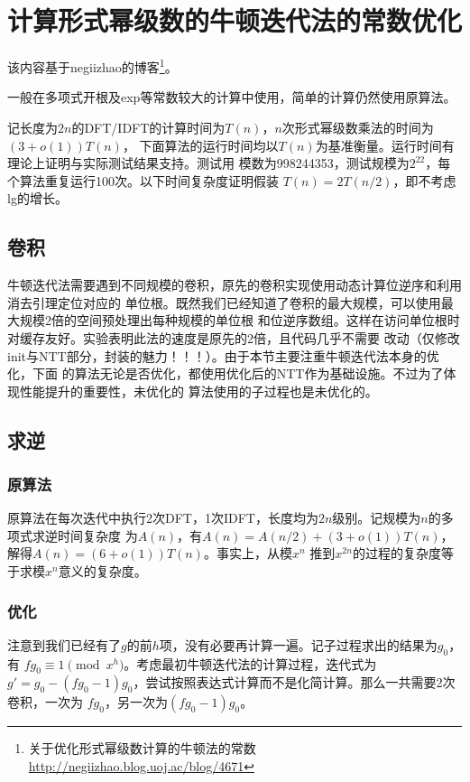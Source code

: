 \section{计算形式幂级数的牛顿迭代法的常数优化}\label{Optmize}
该内容基于negiizhao的博客\footnote{
    关于优化形式幂级数计算的牛顿法的常数\\
    \url{http://negiizhao.blog.uoj.ac/blog/4671}
}。

一般在多项式开根及exp等常数较大的计算中使用，简单的计算仍然使用原算法。

记长度为$2n$的DFT/IDFT的计算时间为$T(n)$，$n$次形式幂级数乘法的时间为$(3+o(1))T(n)$，
下面算法的运行时间均以$T(n)$为基准衡量。运行时间有理论上证明与实际测试结果支持。测试用
模数为998244353，测试规模为$2^{22}$，每个算法重复运行100次。以下时间复杂度证明假装
$T(n)=2T(n/2)$，即不考虑lg的增长。

\subsection{卷积}
牛顿迭代法需要遇到不同规模的卷积，原先的卷积实现使用动态计算位逆序和利用消去引理定位对应的
单位根。既然我们已经知道了卷积的最大规模，可以使用最大规模2倍的空间预处理出每种规模的单位根
和位逆序数组。这样在访问单位根时对缓存友好。实验表明此法的速度是原先的2倍，且代码几乎不需要
改动（仅修改init与NTT部分，封装的魅力！！！）。由于本节主要注重牛顿迭代法本身的优化，下面
的算法无论是否优化，都使用优化后的NTT作为基础设施。不过为了体现性能提升的重要性，未优化的
算法使用的子过程也是未优化的。

\subsection{求逆}
\subsubsection{原算法}
原算法在每次迭代中执行2次DFT，1次IDFT，长度均为$2n$级别。记规模为$n$的多项式求逆时间复杂度
为$A(n)$，有$A(n)=A(n/2)+(3+o(1))T(n)$，解得$A(n)=(6+o(1))T(n)$。事实上，从模$x^n$
推到$x^{2n}$的过程的复杂度等于求模$x^n$意义的复杂度。
\subsubsection{优化}
注意到我们已经有了$g$的前$h$项，没有必要再计算一遍。记子过程求出的结果为$g_0$，有
$fg_0\equiv 1\pmod{x^h}$。考虑最初牛顿迭代法的计算过程，迭代式为
$g'=g_0-(fg_0-1)g_0$，尝试按照表达式计算而不是化简计算。那么一共需要2次卷积，一次为
$fg_0$，另一次为$(fg_0-1)g_0$。

